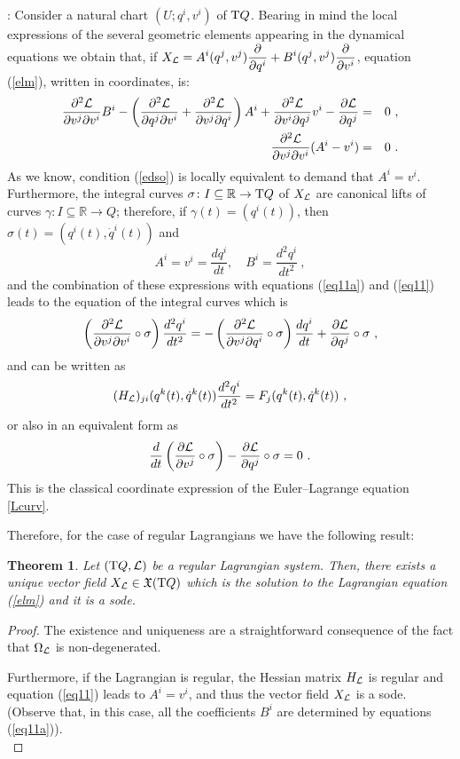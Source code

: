 \documentclass[12pt]{report}
\newtheorem{teor}{Theorem}[chapter]
\def\beq{\begin{equation}}
\def\eeq{\end{equation}}
\def\bea{\begin{eqnarray}}
\def\eea{\end{eqnarray}}
\def\dst{\displaystyle}
\def\derpar#1#2{\frac{\partial{#1}}{\partial{#2}}}
\def\qed{\ifvmode\removelastskip\fi
{\unskip\nobreak\hfil\penalty50\hbox{}\nobreak\hfil
\hbox{\vrule height1.2ex width1.2ex}\parfillskip=0pt
\finalhyphendemerits=0 \par\smallskip}}
\def\vf{\mathfrak X}
\def\Lag{{\cal L}}
\def\Real{\mathbb{R}}
\def\Tan{{\rm T}}
\begin{document}
:
Consider a natural chart $(U;q^i,v^i)$ of $\Tan Q$.
Bearing in mind  the local expressions of the several geometric elements
appearing in the dynamical equations we obtain that, if
\(\dst X_\Lag = A^i(q^j,v^j) \derpar{}{q^i} +
B^i(q^j,v^j) \derpar{}{v^i}\),
equation (\ref{elm}), written in coordinates, is:
\bea
\frac{\partial^2\Lag}{\partial v^j \partial v^i}B^i -
\left(\frac{\partial^2\Lag}{\partial q^j \partial v^i} +
\frac{\partial^2\Lag}{\partial v^j \partial q^i}\right)A^i +
\frac{\partial^2\Lag}{\partial v^i \partial q^j}v^i -
\derpar{\Lag}{q^j} &=& 0 \ ,
\label{eq11a}
\\
\frac{\partial^2\Lag}{\partial v^j \partial v^i}(A^i-v^i) &=& 0 \ .
\label{eq11}
\eea
As we know, condition (\ref{edso}) is locally equivalent to demand that
$A^i=v^i$. Furthermore, the integral curves
$\sigma\colon I\subseteq\Real\to\Tan Q$ of $X_\Lag$
are canonical lifts of curves
$\gamma\colon I\subseteq\Real\to Q$; therefore, if
$\gamma(t)=(q^i(t))$, then $\sigma(t)=(q^i(t),\dot q^i(t))$ and
$$
A^i = v^i = \frac{d q^i}{d t}
,\quad
B^i = \frac{d^2q^i}{d t^2} \ ,
$$
and the combination of these expressions with equations (\ref{eq11a}) and (\ref{eq11}) leads to the
equation of  the integral curves which is
$$
\left(\frac{\partial^2\Lag}{\partial v^j \partial v^i}\circ\sigma\right)
\frac{d^2q^i}{d t^2} =
-\left(\frac{\partial^2\Lag}{\partial v^j \partial q^i}\circ\sigma\right)
\frac{d q^i}{d t} +
\derpar{\Lag}{q^j}\circ\sigma \ ,
$$
and can be written as
$$
 (H_\Lag)_{ji}(q^k(t),\dot q^k(t))\frac{d^2q^i}{d t^2} =F_j( q^k(t),\dot q^k(t)) \ ,
$$
or also in an equivalent form as
\beq
\frac{d}{d t}\left(\derpar{\Lag}{v^j}\circ\sigma\right)-
\derpar{\Lag}{q^j}\circ\sigma=0 \ .
\label{ELequats}
\eeq
This is the classical coordinate expression of the Euler--Lagrange equation \eqref{Lcurv}.

Therefore, for the case of regular Lagrangians we have the following result:

\begin{teor}
Let $(\Tan Q,\Lag)$ be a regular Lagrangian system.
Then, there exists a unique vector field $X_\Lag\in\vf (\Tan Q)$
which is the solution to the Lagrangian equation
(\ref{elm}) and it is a {\sc sode}.
\end{teor}
\begin{proof}
The existence and uniqueness are a straightforward consequence 
of the fact that $\Omega_\Lag$ is non-degenerated.

Furthermore, if the Lagrangian is regular, the Hessian matrix
$H_\Lag$ is regular and equation (\ref{eq11}) leads to
$A^i = v^i$, and thus the vector field $X_\Lag$ is a {\sc sode}.
(Observe that, in this case, all the coefficients $B^i$ are determined
by equations (\ref{eq11a})).
\\ \qed \end{proof}
\end{document}
